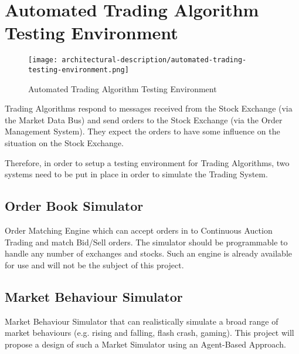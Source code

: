\section{Automated Trading Algorithm Testing Environment}

\begin{figure}[H]
\centerline{\texttt{[image: architectural-description/automated-trading-testing-environment.png]}}
\caption{Automated Trading Algorithm Testing Environment}
\label{fig:automated-trading-algorithm-testing-environment}
\end{figure}

Trading Algorithms respond to messages received from the Stock Exchange (via the Market Data Bus) and send orders to the Stock Exchange (via the Order Management System). They expect the orders to have some influence on the situation on the Stock Exchange. 

Therefore, in order to setup a testing environment for Trading Algorithms, two systems need to be put in place in order to simulate the Trading System.

\subsection{Order Book Simulator}
Order Matching Engine which can accept orders in to Continuous Auction Trading and match Bid/Sell orders. The simulator should be programmable to handle any number of exchanges and stocks. Such an engine is already available for use and will not be the subject of this project.

\subsection{Market Behaviour Simulator}
Market Behaviour Simulator that can realistically simulate a broad range of market behaviours (e.g. rising and falling, flash crash, gaming). This project will propose a design of such a Market Simulator using an Agent-Based Approach.
